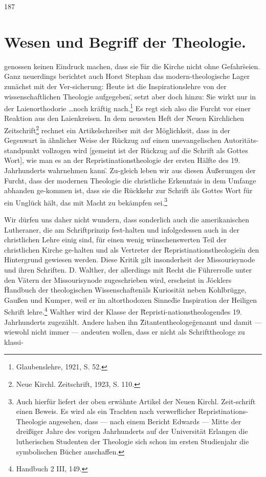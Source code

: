187\section*{Wesen und Begriff der Theologie.}\par genossen keinen Eindruck machen, dass sie \"für die Kirche nicht ohne Gefahr\" seien. Ganz neuerdings berichtet auch Horst Stephan das modern-theologische Lager zunächst mit der Ver-sicherung: \"Heute ist die Inspirationslehre von der wissenschaftlichen Theologie aufgegeben\", setzt aber doch hinzu: \"Sie wirkt nur in der Laienorthodorie \dots noch kräftig nach.\"\footnote{Glaubenslehre, 1921, S. 52.} Es regt sich also die Furcht vor einer Reaktion aus den Laienkreisen. In dem neuesten Heft der \"Neuen Kirchlichen Zeitschrift\"\footnote{Neue Kirchl. Zeitschrift, 1923, S. 110.} rechnet ein Artikelschreiber mit der Möglichkeit, dass in der Gegenwart \"in ähnlicher Weise der Rückzug auf einen unevangelischen Autoritäts-standpunkt vollzogen wird [gemeint ist der Rückzug auf die Schrift als Gottes Wort], wie man es an der Repristinationstheologie der ersten Hälfte des 19. Jahrhunderts wahrnehmen kann\". Zu-gleich leben wir aus diesen Äußerungen der Furcht, dass der modernen Theologie die christliche Erkenntnis in dem Umfange abhanden ge-kommen ist, dass sie die Rückkehr zur Schrift \"als Gottes Wort für ein Unglück hält, das mit Macht zu bekämpfen sei.\"\footnote{Auch hierfür liefert der oben erwähnte Artikel der Neuen Kirchl. Zeit-schrift einen Beweis. Es wird als ein Trachten nach verwerflicher Repristinations-Theologie angesehen, dass --- nach einem Bericht Edwards --- Mitte der dreißiger Jahre des vorigen Jahrhunderts auf der Universität Erlangen die lutherischen Studenten der Theologie sich schon im ersten Studienjahr die symbolischen Bücher anschaffen.}\par Wir dürfen uns daher nicht wundern, dass sonderlich auch die amerikanischen Lutheraner, die am Schriftprinzip fest-halten und infolgedessen auch in der christlichen Lehre einig sind, für einen wenig wünschenswerten Teil der christlichen Kirche ge-halten und als Vertreter der \"Repristinationstheologie\" in den Hintergrund gewiesen werden. Diese Kritik gilt insonderheit der Missourisynode und ihren Schriften. D. Walther, der allerdings mit Recht die Führerrolle unter den Vätern der Missourisynode zugeschrieben wird, erscheint in Jöcklers \"Handbuch der theologischen Wissenschaften\" als Kuriosität neben Kohlbrügge, Gaußen und Kumper, weil er \"im altorthodoxen Sinne\" die Inspiration der Heiligen Schrift lehre.\footnote{Handbuch 2 III, 149.} Walther wird der Klasse der \"Repristi-nationstheologen\" des 19. Jahrhunderts zugezählt. Andere haben ihn \"Zitantentheologe\" genannt und damit --- wiewohl nicht immer --- andeuten wollen, dass er nicht als Schrifttheologe zu klassi-
